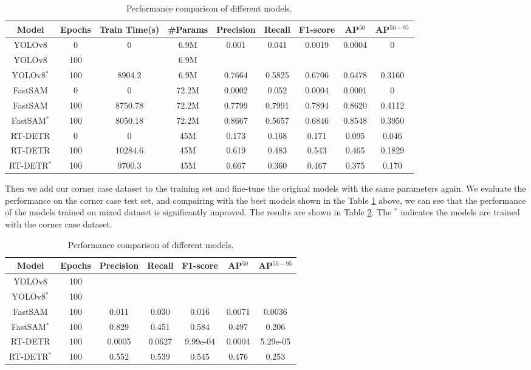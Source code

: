 \documentclass{article}
\begin{document}
\begin{table}[htbp]
  \centering
  \begin{tabular}{c|c|c|c|c|c|c|c|c}
    \hline
    Model & Epochs & Train Time(s) & \#Params & Precision & Recall & F1-score & AP$^{50}$ & AP$^{50-95}$ \\
    \hline
    YOLOv8 & 0 & 0 & 6.9M & 0.001 & 0.041 & 0.0019 & 0.0004 & 0 \\
    YOLOv8 & 100 &  & 6.9M &  &  &  &  &  \\
    YOLOv8$^*$ & 100 & 8904.2 & 6.9M & 0.7664 & 0.5825 & 0.6706 & 0.6478 & 0.3160 \\
    FastSAM & 0 & 0 & 72.2M & 0.0002 & 0.052 & 0.0004 & 0.0001 & 0\\
    FastSAM & 100 & 8750.78 & 72.2M & 0.7799 & 0.7991 & 0.7894 & 0.8620 & 0.4112 \\
    FastSAM$^*$ & 100 & 8050.18 & 72.2M & 0.8667 & 0.5657 & 0.6846 & 0.8548 & 0.3950 \\
    RT-DETR & 0 & 0 & 45M & 0.173 & 0.168 & 0.171 & 0.095 & 0.046 \\
    RT-DETR & 100 & 10284.6 & 45M & 0.619 & 0.483 & 0.543 & 0.465 & 0.1829 \\
    RT-DETR$^*$ & 100 & 9700.3 & 45M & 0.667 & 0.360 & 0.467 & 0.375 & 0.170 \\
    \hline
  \end{tabular}
  \caption{Performance comparison of different models.}
  \label{tab:model_performance}
\end{table}

Then we add our corner case dataset to the training set and fine-tune the original models with the same parameters again. We evaluate the performance on the corner case test set, and compairing with the best models shown in the Table \ref{tab:model_performance} above, we can see that the performance of the models trained on mixed dataset is significantly improved. The results are shown in Table \ref{tab:corner_case_performance}. The $^*$ indicates the models are trained with the corner case dataset.

\begin{table}[htbp]
  \centering
  \begin{tabular}{c|c|c|c|c|c|c}
    \hline
    Model & Epochs & Precision & Recall & F1-score & AP$^{50}$ & AP$^{50-95}$ \\
    \hline
    YOLOv8 & 100 &  &  &  &  &  \\
    YOLOv8$^*$ & 100  &  &  &  &  &  \\
    FastSAM & 100  & 0.011  & 0.030 & 0.016 & 0.0071 & 0.0036 \\
    FastSAM$^*$ & 100  & 0.829 & 0.451 & 0.584 & 0.497 & 0.206 \\
    RT-DETR & 100  & 0.0005 & 0.0627 & 9.99e-04 & 0.0004 & 5.29e-05 \\
    RT-DETR$^*$ & 100  & 0.552 & 0.539 & 0.545 & 0.476 & 0.253 \\
    \hline
  \end{tabular}
  \caption{Performance comparison of different models.}
  \label{tab:corner_case_performance}
\end{table}
\end{document}
